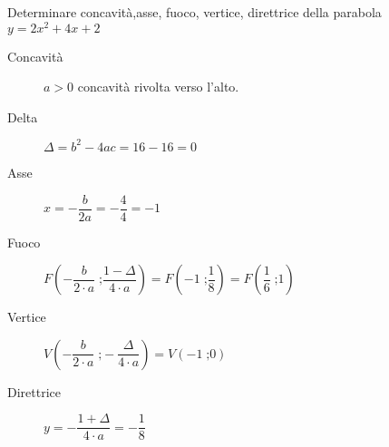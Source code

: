 	Determinare concavità,asse, fuoco, vertice, direttrice della parabola $y=2x^2+4x+2$
	\begin{description}
		\item[Concavità] $a>0$ concavità rivolta verso l'alto.
		\item[Delta] $\Delta=b^2-4ac=16-16=0$
		\item[Asse] $x=-\dfrac{b}{2a}=-\dfrac{4}{4}=-1$
		\item[Fuoco] $F\left(-\dfrac{b}{2\cdot a}\;\text{;}\dfrac{1-\Delta}{4\cdot a}\right)=F\left(-1\;\text{;}\dfrac{1}{8}\right)=F\left(\dfrac{1}{6}\;\text{;} 1\right)$
		\item[Vertice] $V\left(-\dfrac{b}{2\cdot a}\;\text{;}-\dfrac{\Delta}{4\cdot a}\right)=V\left(-1\;\text{;}0\right)$
		\item[Direttrice] $y=-\dfrac{1+\Delta}{4\cdot a}=-\dfrac{1}{8}$
	\end{description}
